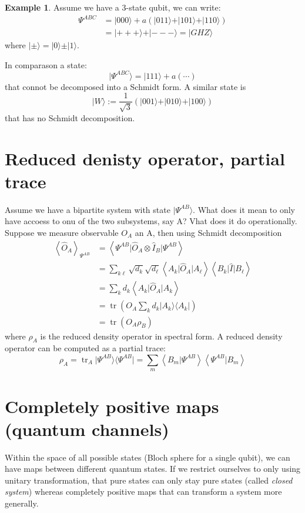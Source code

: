 \documentclass[12pt]{book}
\theoremstyle{definition}
\newtheorem*{expl}{\bfseries Example}
\newcommand{\scalar}[1]{\left\langle {#1}\right\rangle}
\let\oldsum\sum
\renewcommand{\sum}[2]{\oldsum\limits_{#1}^{#2}}
\newcommand{\para}[1]{\left( {#1} \right)}
\newcommand{\bra}[1]{\langle {#1} \vert}
\newcommand{\ket}[1]{\vert {#1} \rangle}
\DeclareMathOperator{\tr}{tr}
\begin{document}
\begin{expl}
Assume we have a 3-state qubit, we can write:
\begin{align*}
  \Psi^{ABC} & = \ket{000} + a \para{\ket{011} + \ket{101} + \ket{110}} \\
  & = \ket{+++} + \ket{---} = \ket{GHZ}
\end{align*}
where $\ket{\pm} = \ket{0} \pm \ket{1}$.

In comparason a state:
\begin{equation*}
  \ket{\Psi^{ABC}} = \ket{111} + a \para{\cdots}
\end{equation*}
that connot be decomposed into a Schmidt form. A similar state is
\begin{equation*}
  \ket{W} := \frac{1}{\sqrt{3}} \para{\ket{001} + \ket{010} + \ket{100}}
\end{equation*}
that has no Schmidt decomposition.
\end{expl}

\section{Reduced denisty operator, partial trace}

Assume we have a bipartite system with state $\ket{\Psi^{AB}}$. What does it mean to only have accoess to onu of the two subsystems, say A? Vhat does it do operationally. Suppose we measure observable $O_A$ an A, then using Schmidt decomposition
\begin{align*}
  \scalar{\hat O_A}_{\Psi^{AB}} & = \scalar{\Psi^{AB} \vert \hat O_A \otimes \hat I_B \vert \Psi^{AB}} \\
  & = \oldsum_{k\ell} \sqrt{d_k} \sqrt{d_\ell} \scalar{A_k \vert \hat O_A \vert A_\ell} \scalar{B_k \vert \hat I \vert B_\ell} \\
  & = \oldsum_{k} d_k \scalar{A_k \vert \hat O_A \vert A_k} \\
  & = \tr\para{O_A \oldsum_k d_k \ket{A_k} \bra{A_k}} \\
  & = \tr\para{O_A \rho_B}
\end{align*}
where $\rho_A$ is the reduced density operator in spectral form. A reduced density operator can be computed as a partial trace:
\begin{equation}
  \rho_A = \tr_A \ket{\Psi^{AB}} \bra{\Psi^{AB}} = \oldsum_m \scalar{B_m \vert \Psi^{AB}} \scalar{\Psi^{AB} \vert B_m}
\end{equation}


\section{Completely positive maps (quantum channels)}
Within the space of all possible states (Bloch sphere for a single qubit), we can have maps between different quantum states. If we restrict ourselves to only using unitary transformation, that pure states can only stay pure states (called \emph{closed system}) whereas completely positive maps that can transform a system more generally.
\end{document}
